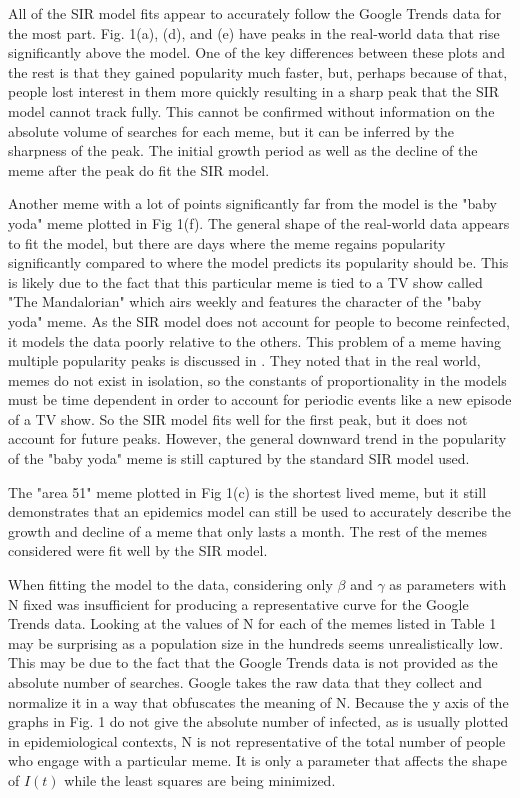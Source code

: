\documentclass[12pt, letterpaper]{article}
\begin{document}
All of the SIR model fits appear to accurately follow the Google Trends data for the most part. Fig. 1(a), (d), and (e) have peaks in the real-world data that rise significantly above the model. One of the key differences between these plots and the rest is that they gained popularity much faster, but, perhaps because of that, people lost interest in them more quickly resulting in a sharp peak that the SIR model cannot track fully. This cannot be confirmed without information on the absolute volume of searches for each meme, but it can be inferred by the sharpness of the peak. The initial growth period as well as the decline of the meme after the peak do fit the SIR model.

Another meme with a lot of points significantly far from the model is the "baby yoda" meme plotted in Fig 1(f). The general shape of the real-world data appears to fit the model, but there are days where the meme regains popularity significantly compared to where the model predicts its popularity should be. This is likely due to the fact that this particular meme is tied to a TV show called "The Mandalorian" which airs weekly and features the character of the "baby yoda" meme. As the SIR model does not account for people to become reinfected, it models the data poorly relative to the others. This problem of a meme having multiple popularity peaks is discussed in \cite{wang2011epidemiological}. They noted that in the real world, memes do not exist in isolation, so the constants of proportionality in the models must be time dependent in order to account for periodic events like a new episode of a TV show. So the SIR model fits well for the first peak, but it does not account for future peaks. However, the general downward trend in the popularity of the "baby yoda" meme is still captured by the standard SIR model used.

The "area 51" meme plotted in Fig 1(c) is the shortest lived meme, but it still demonstrates that an epidemics model can still be used to accurately describe the growth and decline of a meme that only lasts a month. The rest of the memes considered were fit well by the SIR model.

When fitting the model to the data, considering only $\beta$ and $\gamma$ as parameters with N fixed was insufficient for producing a representative curve for the Google Trends data. Looking at the values of N for each of the memes listed in Table 1 may be surprising as a population size in the hundreds seems unrealistically low. This may be due to the fact that the Google Trends data is not provided as the absolute number of searches. Google takes the raw data that they collect and normalize it in a way that obfuscates the meaning of N. Because the y axis of the graphs in Fig. 1 do not give the absolute number of infected, as is usually plotted in epidemiological contexts, N is not representative of the total number of people who engage with a particular meme. It is only a parameter that affects the shape of $I(t)$ while the least squares are being minimized.
\end{document}
